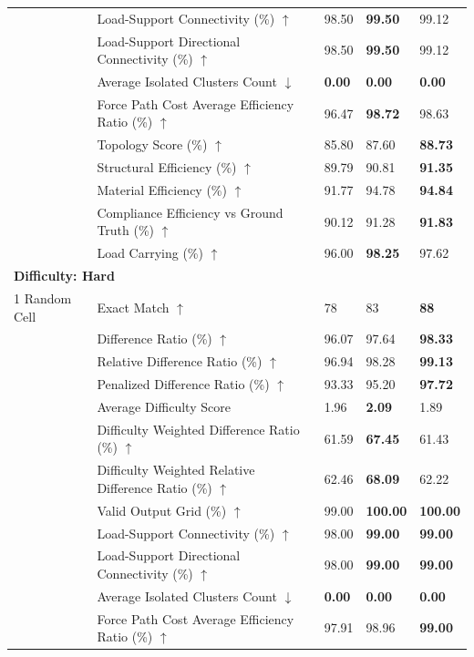 \begin{table}[!h]
{\begin{tabular}{lllll}
 & Load-Support Connectivity (\%) $\uparrow$ & 98.50 & \textbf{99.50} & 99.12 \\
 & Load-Support Directional Connectivity (\%) $\uparrow$ & 98.50 & \textbf{99.50} & 99.12 \\
 & Average Isolated Clusters Count $\downarrow$ & \textbf{0.00} & \textbf{0.00} & \textbf{0.00} \\
 & Force Path Cost Average Efficiency Ratio (\%) $\uparrow$ & 96.47 & \textbf{98.72} & 98.63 \\
 & Topology Score (\%) $\uparrow$ & 85.80 & 87.60 & \textbf{88.73} \\
 & Structural Efficiency (\%) $\uparrow$ & 89.79 & 90.81 & \textbf{91.35} \\
 & Material Efficiency (\%) $\uparrow$ & 91.77 & 94.78 & \textbf{94.84} \\
 & Compliance Efficiency vs Ground Truth (\%) $\uparrow$ & 90.12 & 91.28 & \textbf{91.83} \\
 & Load Carrying (\%) $\uparrow$ & 96.00 & \textbf{98.25} & 97.62 \\
\midrule
\multicolumn{5}{l}{\textbf{Difficulty: Hard}}\\
\midrule
1 Random Cell & Exact Match $\uparrow$ & 78 & 83 & \textbf{88} \\
 & Difference Ratio (\%) $\uparrow$ & 96.07 & 97.64 & \textbf{98.33} \\
 & Relative Difference Ratio (\%) $\uparrow$ & 96.94 & 98.28 & \textbf{99.13} \\
 & Penalized Difference Ratio (\%) $\uparrow$ & 93.33 & 95.20 & \textbf{97.72} \\
 & Average Difficulty Score & 1.96 & \textbf{2.09} & 1.89 \\
 & Difficulty Weighted Difference Ratio (\%) $\uparrow$ & 61.59 & \textbf{67.45} & 61.43 \\
 & Difficulty Weighted Relative Difference Ratio (\%) $\uparrow$ & 62.46 & \textbf{68.09} & 62.22 \\
 & Valid Output Grid (\%) $\uparrow$ & 99.00 & \textbf{100.00} & \textbf{100.00} \\
 & Load-Support Connectivity (\%) $\uparrow$ & 98.00 & \textbf{99.00} & \textbf{99.00} \\
 & Load-Support Directional Connectivity (\%) $\uparrow$ & 98.00 & \textbf{99.00} & \textbf{99.00} \\
 & Average Isolated Clusters Count $\downarrow$ & \textbf{0.00} & \textbf{0.00} & \textbf{0.00} \\
 & Force Path Cost Average Efficiency Ratio (\%) $\uparrow$ & 97.91 & 98.96 & \textbf{99.00} \\

\end{tabular}}
\end{table}
